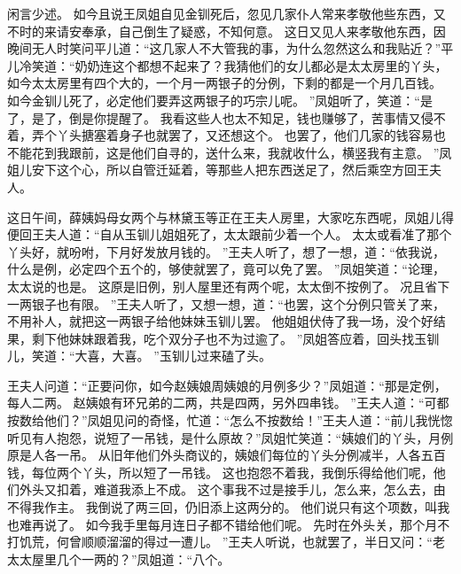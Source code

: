 闲言少述。
如今且说王凤姐自见金钏死后，忽见几家仆人常来孝敬他些东西，又不时的来请安奉承，自己倒生了疑惑，不知何意。
这日又见人来孝敬他东西，因晚间无人时笑问平儿道：“这几家人不大管我的事，为什么忽然这么和我贴近？”平儿冷笑道：“奶奶连这个都想不起来了？我猜他们的女儿都必是太太房里的丫头，如今太太房里有四个大的，一个月一两银子的分例，下剩的都是一个月几百钱。
如今金钏儿死了，必定他们要弄这两银子的巧宗儿呢。
”凤姐听了，笑道：“是了，是了，倒是你提醒了。
我看这些人也太不知足，钱也赚够了，苦事情又侵不着，弄个丫头搪塞着身子也就罢了，又还想这个。
也罢了，他们几家的钱容易也不能花到我跟前，这是他们自寻的，送什么来，我就收什么，横竖我有主意。
”凤姐儿安下这个心，所以自管迁延着，等那些人把东西送足了，然后乘空方回王夫人。
\par
这日午间，薛姨妈母女两个与林黛玉等正在王夫人房里，大家吃东西呢，凤姐儿得便回王夫人道：“自从玉钏儿姐姐死了，太太跟前少着一个人。
太太或看准了那个丫头好，就吩咐，下月好发放月钱的。
”王夫人听了，想了一想，道：“依我说，什么是例，必定四个五个的，够使就罢了，竟可以免了罢。
”凤姐笑道：“论理，太太说的也是。
这原是旧例，别人屋里还有两个呢，太太倒不按例了。
况且省下一两银子也有限。
”王夫人听了，又想一想，道：“也罢，这个分例只管关了来，
不用补人，就把这一两银子给他妹妹玉钏儿罢。
他姐姐伏侍了我一场，没个好结果，剩下他妹妹跟着我，吃个双分子也不为过逾了。
”凤姐答应着，回头找玉钏儿，笑道：“大喜，大喜。
”玉钏儿过来磕了头。
\par
王夫人问道：“正要问你，如今赵姨娘周姨娘的月例多少？”凤姐道：“那是定例，每人二两。
赵姨娘有环兄弟的二两，共是四两，另外四串钱。
”王夫人道：“可都按数给他们？”凤姐见问的奇怪，忙道：“怎么不按数给！”王夫人道：“前儿我恍惚听见有人抱怨，说短了一吊钱，是什么原故？”凤姐忙笑道：“姨娘们的丫头，月例原是人各一吊。
从旧年他们外头商议的，姨娘们每位的丫头分例减半，人各五百钱，每位两个丫头，所以短了一吊钱。
这也抱怨不着我，我倒乐得给他们呢，他们外头又扣着，难道我添上不成。
这个事我不过是接手儿，怎么来，怎么去，由不得我作主。
我倒说了两三回，仍旧添上这两分的。
他们说只有这个项数，叫我也难再说了。
如今我手里每月连日子都不错给他们呢。
先时在外头关，那个月不打饥荒，何曾顺顺溜溜的得过一遭儿。
”王夫人听说，也就罢了，半日又问：“老太太屋里几个一两的？”凤姐道：“八个。
